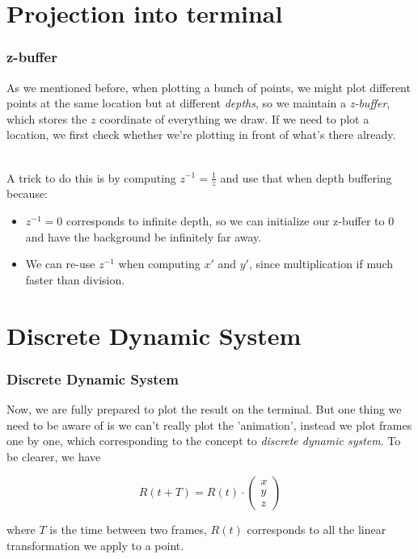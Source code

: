 \documentclass[12pt, t]{beamer}
\renewcommand{\emph}[1]{{\color{Turquoise3}\textsl{#1}}}
\newcommand{\nullspace}{~\\[15pt]}
\begin{document}
\section{Projection into terminal}
\begin{frame}
    \frametitle{z-buffer}

    As we mentioned before, when plotting a bunch of points, we might plot different points at the
    same location but at different \emph{depths}, so we maintain a \emph{z-buffer}, which stores
    the $z$ coordinate of everything we draw. If we need to plot a location, we first check whether
    we're plotting in front of what's there already.

    \nullspace
    A trick to do this is by computing $z^{-1} = \frac{1}{z}$ and use that when depth buffering
    because:
    \begin{itemize}
        \item $z^{-1} = 0$ corresponds to infinite depth, so we can initialize our z-buffer to 0 and
              have the background be infinitely far away.
        \item We can re-use $z^{-1}$ when computing $x'$ and $y'$, since multiplication if much faster
              than division.
    \end{itemize}

\end{frame}


\section{Discrete Dynamic System}
\begin{frame}
    \frametitle{Discrete Dynamic System}

    Now, we are fully prepared to plot the result on the terminal. But one thing we need to be aware
    of is we can't really plot the 'animation', instead we plot frames one by one, which corresponding
    to the concept to \emph{discrete dynamic system}. To be clearer, we have

    \begin{equation*}
        R(t + T) = R(t)
        \cdot
        \begin{pmatrix}
            x \\
            y \\
            z
        \end{pmatrix}
    \end{equation*}

    where $T$ is the time between two frames, $R(t)$ corresponds to all the linear transformation we
    apply to a point.

\end{frame}
\end{document}
